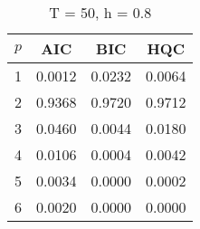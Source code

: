 \begin{table}[ht]
\captionsetup{justification=raggedright,singlelinecheck=false}
\caption*{T = 50, h = 0.8}
\begin{tabular}{c|ccc}
  $p$ & AIC & BIC & HQC \\\hline
  1 & 0.0012 & 0.0232 & 0.0064 \\
  2 & 0.9368 & 0.9720 & 0.9712 \\
  3 & 0.0460 & 0.0044 & 0.0180 \\
  4 & 0.0106 & 0.0004 & 0.0042 \\
  5 & 0.0034 & 0.0000 & 0.0002 \\
  6 & 0.0020 & 0.0000 & 0.0000 \\
\end{tabular}
\end{table}
